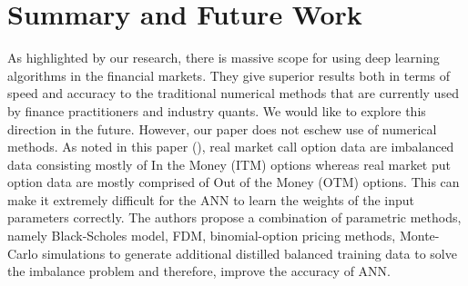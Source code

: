\documentclass[12pt,a4paper]{article}
\begin{document}
\section{Summary and Future Work}
As highlighted by our research, there is massive scope for using deep learning algorithms in the financial markets. They give superior results both in terms of speed and accuracy to the traditional numerical methods that are currently used by finance practitioners and industry quants. We would like to explore this direction in the future. However, our paper does not eschew use of numerical methods. As noted in this paper (\cite{JANG202143}), real market call option data are imbalanced data consisting mostly of In the Money (ITM) options whereas real market put option data are mostly comprised of Out of the Money (OTM) options. This can make it extremely difficult for the ANN to learn the weights of the input parameters correctly. The authors propose a combination of parametric methods, namely Black-Scholes model, FDM, binomial-option pricing methods, Monte-Carlo simulations to generate additional distilled balanced training data to solve the imbalance problem and therefore, improve the accuracy of ANN. 

\printbibliography
\end{document}
